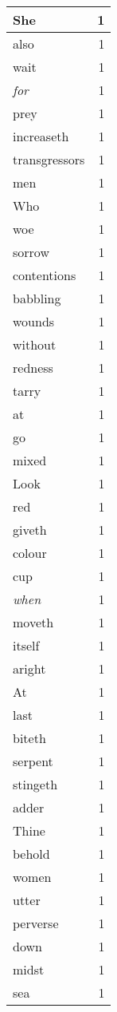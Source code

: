 \begin{center}
\begin{longtable}{l|r}
She & 1\\ \hline 
also & 1\\ \hline 
wait & 1\\ \hline 
\emph{for} & 1\\ \hline 
prey & 1\\ \hline 
increaseth & 1\\ \hline 
transgressors & 1\\ \hline 
men & 1\\ \hline 
Who & 1\\ \hline 
woe & 1\\ \hline 
sorrow & 1\\ \hline 
contentions & 1\\ \hline 
babbling & 1\\ \hline 
wounds & 1\\ \hline 
without & 1\\ \hline 
redness & 1\\ \hline 
tarry & 1\\ \hline 
at & 1\\ \hline 
go & 1\\ \hline 
mixed & 1\\ \hline 
Look & 1\\ \hline 
red & 1\\ \hline 
giveth & 1\\ \hline 
colour & 1\\ \hline 
cup & 1\\ \hline 
\emph{when} & 1\\ \hline 
moveth & 1\\ \hline 
itself & 1\\ \hline 
aright & 1\\ \hline 
At & 1\\ \hline 
last & 1\\ \hline 
biteth & 1\\ \hline 
serpent & 1\\ \hline 
stingeth & 1\\ \hline 
adder & 1\\ \hline 
Thine & 1\\ \hline 
behold & 1\\ \hline 
women & 1\\ \hline 
utter & 1\\ \hline 
perverse & 1\\ \hline 
down & 1\\ \hline 
midst & 1\\ \hline 
sea & 1\\ \hline 

\end{longtable}
\end{center}

